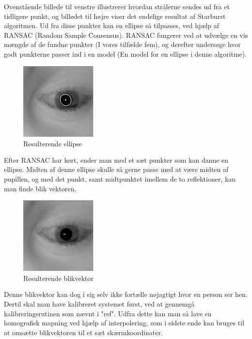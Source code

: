 \documentclass[rapport.tex]{subfiles}
\begin{document}
	Ovenstående billede til venstre illustrerer hvordan strålerne sendes ud fra et tidligere punkt, og billedet til højre viser det endelige resultat af Starburst algoritmen. Ud fra disse punkter kan en ellipse så tilpasses, ved hjælp af RANSAC (Random Sample Consensus). RANSAC fungerer ved at udvælge en vis mængde af de fundne punkter (I vores tilfælde fem), og derefter undersøge hvor godt punkterne passer ind i en model (En model for en ellipse i denne algoritme).
		
		
	\begin{figure}
	\centering
	\includegraphics[width=0.4\linewidth]{Billeder/Starburst,Ellipse.png}
	\caption{Resulterende ellipse}
	\label{fig:Starburst,Ellipse}
	\end{figure}
	
	Efter RANSAC har kørt, ender man med et sæt punkter som kan danne en ellipse. Midten af denne ellipse skulle så gerne passe med at være midten af pupillen, og med det punkt, samt midtpunktet imellem de to reflektioner, kan man finde blik vektoren.
	
	\begin{figure}
	\centering
	\includegraphics[width=0.4\linewidth]{Billeder/Starburst,Gaze.png}
	\caption{Resulterende blikvektor}
	\label{fig:Starburst,Gaze}
	\end{figure}
	
	Denne blikvektor kan dog i sig selv ikke fortælle nøjagtigt hvor en person ser hen. Dertil skal man have kalibreret systemet først, ved at gennemgå kalibreringsrutinen som nævnt i "ref". Udfra dette kan man så lave en homografisk mapning ved hjælp af interpolering, som i sidste ende kan bruges til at omsætte blikvektoren til et sæt skærmkoordinater.
	
\end{document}
